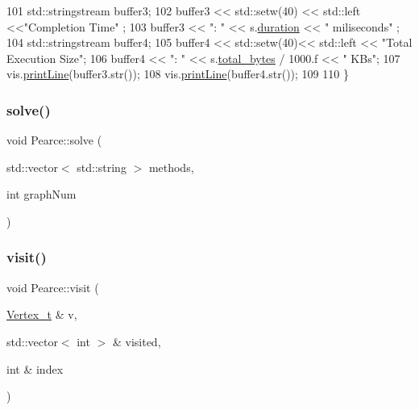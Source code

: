 \begin{DoxyCode}
101     std::stringstream buffer3;
102             buffer3 << std::setw(40) << std::left <<\textcolor{stringliteral}{"Completion Time"} ;
103             buffer3 << \textcolor{stringliteral}{": "} << s.\hyperlink{struct_utility_structs_1_1_storage_items_a65e7df5611a4e144cc27576bd3041f6c}{duration} << \textcolor{stringliteral}{" miliseconds"} ;
104             std::stringstream buffer4;
105             buffer4 << std::setw(40)<< std::left << \textcolor{stringliteral}{"Total Execution Size"};
106             buffer4 << \textcolor{stringliteral}{": "} << s.\hyperlink{struct_utility_structs_1_1_storage_items_a39cf482db54d8e6ac473b438444c8a1e}{total\_bytes} / 1000.f << \textcolor{stringliteral}{" KBs"};
107             vis.\hyperlink{class_visualize_abce6cd538dc0715b21851e0bf0377d85}{printLine}(buffer3.str());
108             vis.\hyperlink{class_visualize_abce6cd538dc0715b21851e0bf0377d85}{printLine}(buffer4.str());
109 
110 \}
\end{DoxyCode}
\mbox{\label{class_pearce_a7c6ea7dde3dc3e127e4fc6ad1892974e}} 
\subsubsection{\texorpdfstring{solve()}{solve()}}
{\footnotesize\ttfamily void Pearce\+::solve (\begin{DoxyParamCaption}\item[{std\+::vector$<$ std\+::string $>$}]{methods,  }\item[{int}]{graph\+Num }\end{DoxyParamCaption})}

\mbox{\label{class_pearce_ac5e668d0d21ee0dad33cea171b9e2022}} 
\subsubsection{\texorpdfstring{visit()}{visit()}}
{\footnotesize\ttfamily void Pearce\+::visit (\begin{DoxyParamCaption}\item[{\hyperlink{class_graph_component_ae67114a6ce5a001dc35e1996e1b45aa0}{Vertex\+\_\+t} \&}]{v,  }\item[{std\+::vector$<$ int $>$ \&}]{visited,  }\item[{int \&}]{index }\end{DoxyParamCaption})}



